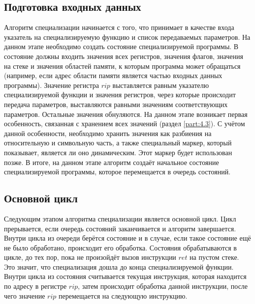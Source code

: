 \documentclass{spbau-diploma}
\begin{document}
\subsection{ Подготовка входных данных}
Алгоритм специализации начинается с того, что принимает в качестве входа указатель на специализируемую функцию и список передаваемых параметров. На данном этапе необходимо создать состояние специализируемой программы. В состояние должны входить значения всех регистров, значения флагов, значения на стеке и значения областей памяти, к которым программа может обращаться (например, если адрес области памяти является частью входных данных программы). Значение регистра $rip$ выставляется равным указателю специализируемой функции и значения регистров, через которые происходит передача параметров, выставляются равными значениям соответствующих параметров. Остальные значения обнуляются. На данном этапе возникает первая особенность, связанная с хранением всех значений (раздел \ref{part:4.3}).
С учётом данной особенности, необходимо хранить значения как разбиения на относительную и символьную часть, а также специальный маркер, который показывает, является ли оно динамическим. Этот маркер будет использован позже. В итоге, на данном этапе алгоритм создаёт начальное состояние специализируемой программы, которое перемещается в очередь состояний.

\subsection{Основной цикл}
Следующим этапом алгоритма специализации является основной цикл. Цикл прерывается, если очередь состояний заканчивается и алгоритм завершается. Внутри цикла из очереди берётся состояние и в случае, если такое состояние ещё не было обработано, происходит его обработка. Состояния обрабатываются в цикле, до тех пор, пока не произойдёт вызов инструкции $ret$ на пустом стеке. Это значит, что специализация дошла до конца специализируемой функции. Внутри цикла из состояния считывается текущая инструкция, которая находится по адресу в регистре $rip$, затем происходит обработка данной инструкции, после чего значение $rip$ перемещается на следующую инструкцию.
\end{document}

